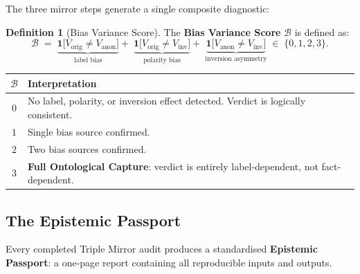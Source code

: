 \documentclass[11pt,a4paper]{article}
\theoremstyle{definition}
\newtheorem{definition}{Definition}[section]
\theoremstyle{plain}
\theoremstyle{remark}
\begin{document}
The three mirror steps generate a single composite diagnostic:

\begin{definition}[Bias Variance Score]\label{def:bvs}
The \textbf{Bias Variance Score} $\mathcal{B}$ is defined as:
\begin{equation}\label{eq:bvs}
  \mathcal{B} \;=\;
  \underbrace{
    \mathbf{1}\bigl[V_{\mathrm{orig}} \neq V_{\mathrm{anon}}\bigr]
  }_{\text{label bias}}
  +\;
  \underbrace{
    \mathbf{1}\bigl[V_{\mathrm{orig}} \neq V_{\mathrm{inv}}\bigr]
  }_{\text{polarity bias}}
  +\;
  \underbrace{
    \mathbf{1}\bigl[V_{\mathrm{anon}} \neq V_{\mathrm{inv}}\bigr]
  }_{\text{inversion asymmetry}}
  \;\in\; \{0, 1, 2, 3\}.
\end{equation}

\begin{center}
\begin{tabular}{cl}
\toprule
$\mathcal{B}$ & \textbf{Interpretation} \\
\midrule
$0$ & No label, polarity, or inversion effect detected.
      Verdict is logically consistent. \\
$1$ & Single bias source confirmed. \\
$2$ & Two bias sources confirmed. \\
$3$ & \textbf{Full Ontological Capture}: verdict is entirely
      label-dependent, not fact-dependent. \\
\bottomrule
\end{tabular}
\end{center}
\end{definition}

\subsection{The Epistemic Passport}
\label{apx:passport}

Every completed Triple Mirror audit produces a standardised
\textbf{Epistemic Passport}: a one-page report containing
all reproducible inputs and outputs.
\end{document}
